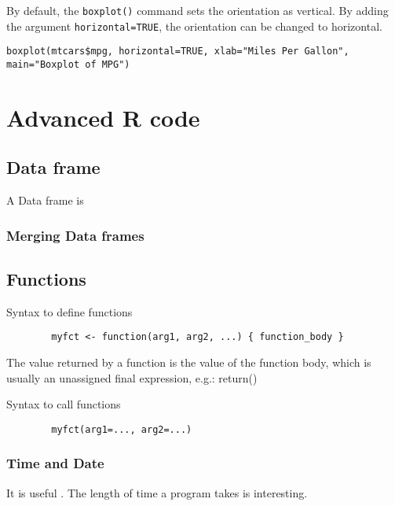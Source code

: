 \documentclass[a4paper,12pt]{article}
\begin{document}
\begin{itemize}
By default, the \texttt{boxplot()} command sets the orientation as vertical. By adding the argument \texttt{horizontal=TRUE}, the orientation can be changed to horizontal.
\footnotesize
\begin{framed}
\begin{verbatim}
boxplot(mtcars$mpg, horizontal=TRUE, xlab="Miles Per Gallon",
main="Boxplot of MPG")
\end{verbatim}
\end{framed}




\newpage
\chapter{Advanced R code}
\section{Data frame}
A Data frame is
\subsection{Merging Data frames}

\section{Functions}
Syntax to define functions

\begin{framed}
\begin{verbatim}
        myfct <- function(arg1, arg2, ...) { function_body }
\end{verbatim}
\end{framed}
The value returned by a function is the value of the function body, which is usually an unassigned final expression, e.g.: return()

Syntax to call functions
\begin{framed}
\begin{verbatim}
        myfct(arg1=..., arg2=...)
\end{verbatim}
\end{framed}


\subsection{Time and Date}
It is useful . The length of time a program takes is interesting.



\end{itemize}
\end{document}
